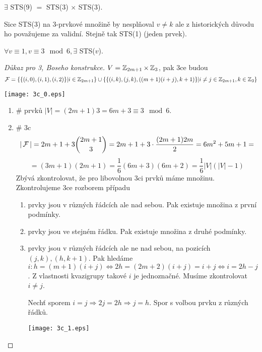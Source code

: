 \begin{consequence}[STS(9)]
	$\exists$ STS(9) $=$ STS(3) $\times$ STS(3).

	Sice STS(3) na 3-prvkové množině by nesplňoval $v \ne k$ ale z historických důvodu ho považujeme za validní.
	Stejně tak STS(1) (jeden prvek).
\end{consequence}

\begin{exercise}
\end{exercise}

\begin{theorem}
    $\forall v\equiv 1, v\equiv 3\mod 6, \exists$ STS($v$).
\end{theorem}
\begin{proof}[Důkaz pro 3, Boseho konstrukce]
	$V = \operatorname{\mathbb{Z}}_{2m + 1} \times \operatorname{\mathbb{Z}}_3$, pak 3ce budou
	\[ \operatorname{\mathcal{F}} = \{ \{(i, 0), (i, 1), (i, 2) \}| i \in \operatorname{\mathbb{Z}}_{2m + 1} \} \cup \{ \{ (i, k), (j, k), ((m+1)(i + j), k + 1) \} | i \ne j \in \operatorname{\mathbb{Z}}_{2m + 1}, k \in \operatorname{\mathbb{Z}}_3 \} \]

	\texttt{[image: 3c\_0.eps]}

	\begin{enumerate}
		\item \# prvků $|V| = (2m + 1)3 = 6m + 3 \equiv 3 \mod 6$.
		\item \# 3c
			\[ |\operatorname{\mathcal{F}}| = 2m + 1 + 3 \binom{2m + 1}{3} = 2m + 1 + 3 \cdot \frac{(2m + 1)2m}{2} = 6m^2 + 5m + 1 = \]
			\[ = (3m + 1)(2m + 1) = \frac{1}{6} (6m + 3)(6m + 2) = \frac{1}{6} |V|(|V| - 1) \]
			Zbývá zkontrolovat, že pro libovolnou 3ci prvků máme množinu.
			Zkontrolujeme 3ce rozborem případu
			\begin{enumerate}
				\item prvky jsou v různých řádcích ale nad sebou.
					Pak existuje množina z první podmínky.
				\item prvky jsou ve stejném řádku.
					Pak existuje množina z druhé podmínky.
				\item prvky jsou v různých řádcích ale ne nad sebou, na pozicích $(j, k), (h, k + 1)$.
					Pak hledáme $i: h = (m + 1)(i + j) \iff 2h = (2m + 2)(i + j) = i + j \iff i = 2h - j$.
					Z vlastnosti kvazigrupy takové $i$ je jednoznačné.
					Musíme zkontrolovat $i \ne j$.

					Nechť sporem $i = j \Rightarrow 2j = 2h \Rightarrow j = h$.
					Spor s volbou prvku z různých řádků.

				\texttt{[image: 3c\_1.eps]}
			\end{enumerate}
	\end{enumerate}
\end{proof}
